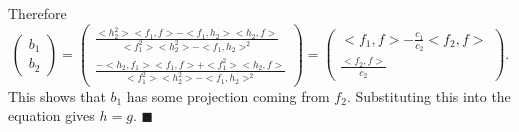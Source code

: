 Therefore
\begin{equation}
  \begin{pmatrix}
    b_1 \\ b_2
  \end{pmatrix}
  =
  \begin{pmatrix}
    \frac{<h_2^2><f_1,f> - <f_1,h_2><h_2,f>}{<f_1^2><h_2^2> - <f_1,h_2>^2} \\
    \frac{-<h_2,f_1><f_1,f> + <f_1^2><h_2,f>}{<f_1^2><h_2^2> - <f_1,h_2>^2}
  \end{pmatrix}
  = 
  \begin{pmatrix}
    <f_1,f> - \frac{c_1}{c_2}<f_2,f> \\
    \frac{<f_2,f>}{c_2}
  \end{pmatrix}.
\end{equation}
This shows that $b_1$ has some projection coming from $f_2$.
Substituting this into the equation gives $h = g$. $\blacksquare$

